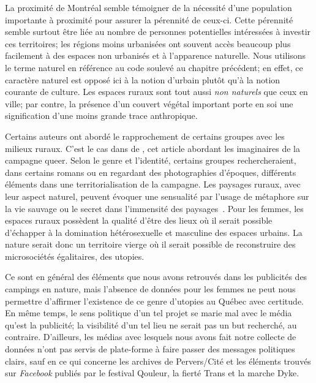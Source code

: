 La proximité de Montréal semble témoigner de la nécessité d'une population importante à proximité pour assurer la pérennité de ceux-ci.
Cette pérennité semble surtout être liée au nombre de personnes potentielles intéressées à investir ces territoires; les régions moins urbanisées ont souvent accès beaucoup plus facilement à des espaces non urbanisés et à l'apparence naturelle.
Nous utilisons le terme naturel en référence au code soulevé au chapitre précédent; en effet, ce caractère naturel est opposé ici à la notion d'urbain plutôt qu'à la notion courante de culture.
Les espaces ruraux sont tout aussi \emph{non naturels} que ceux en ville; par contre, la présence d'un couvert végétal important porte en soi une signification d'une moins grande trace anthropique.

Certains auteurs ont abordé le rapprochement de certains groupes \lgbt{} avec les milieux ruraux.
C'est le cas dans  de \citeauthor{Bell1995a}, cet article abordant les imaginaires de la campagne queer.
Selon le genre et l'identité, certains groupes rechercheraient, dans certains romans ou en regardant des photographies d'époques, différents éléments dans une territorialisation de la campagne.
Les paysages ruraux, avec leur aspect naturel, peuvent évoquer une sensualité par l'usage de métaphore sur la vie sauvage ou le secret dans l'immensité des paysages~\citep[114]{Bell1995a}.
Pour les femmes, les espaces ruraux possèdent la qualité d'être des lieux où il serait possible d'échapper à la domination hétérosexuelle et masculine des espaces urbains.
La nature serait donc un territoire vierge où il serait possible de reconstruire des microsociétés égalitaires, des utopies.

Ce sont en général des éléments que nous avons retrouvés dans les publicités des campings en nature, mais l'absence de données pour les femmes ne peut nous permettre d'affirmer l'existence de ce genre d'utopies au Québec avec certitude.
En même temps, le sens politique d'un tel projet se marie mal avec le média qu'est la publicité; la visibilité d'un tel lieu ne serait pas un but recherché, au contraire.
D'ailleurs, les médias \lgbt{} avec lesquels nous avons fait notre collecte de données n'ont pas servis de plate-forme à faire passer des messages politiques clairs, sauf en ce qui concerne les archives de Pervers/Cité et les éléments trouvés sur \emph{Facebook} publiés par le festival Qouleur, la fierté Trans et la marche Dyke.

